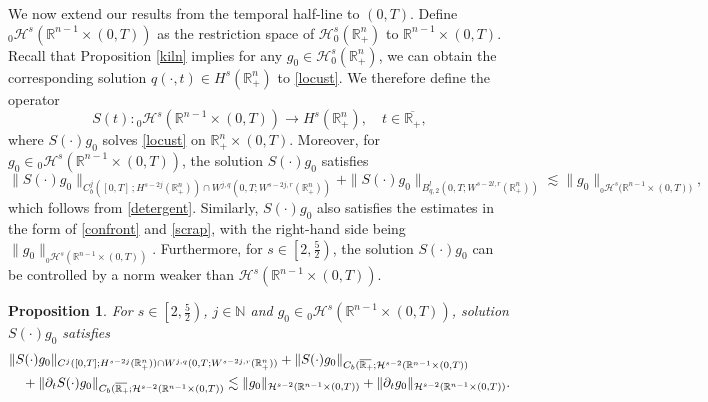 \documentclass[preprint,compress,12pt]{elsarticle}
\newtheorem{proposition}[theorem]{Proposition}
\numberwithin{equation}{section}
\begin{document}
We now extend our results from the temporal half-line to $(0,T)$. Define ${}_{0}\mathcal{H}^{s}(\mathbb{R}^{n-1}\times(0,T))$ as the restriction space
of $\mathcal{H}_{0}^{s}(\mathbb{R}^{n}_{+})$ to $\mathbb{R}^{n-1}\times(0,T)$. Recall that Proposition \ref{kiln} implies for any  $g_{0}\in\mathcal{H}_{0}^{s}(\mathbb{R}_{+}^{n})$, we can obtain the corresponding solution $q(\cdot,t)\in H^{s}(\mathbb{R}^{n}_{+})$ to \eqref{locust}. We therefore define the operator
\begin{equation}\label{st}
	S(t): {}_{0}\mathcal{H}^{s}(\mathbb{R}^{n-1}\times(0,T))\to H^{s}(\mathbb{R}^{n}_{+}),\quad  t\in\overline{\mathbb{R}_{+}},
\end{equation}
where $S(\cdot)g_{0}$  solves \eqref{locust} on $\mathbb{R}^{n}_{+}\times (0,T)$. Moreover, for $g_{0}\in{}_{0}\mathcal{H}^{s}(\mathbb{R}^{n-1}\times(0,T))$, the solution $S(\cdot)g_{0}$ satisfies
{\small
	\begin{equation}\label{grit}
		\|S(\cdot)g_{0}\|_{C_{b}^{j}([0,T]\,;H^{s-2j}(\mathbb{R}^{n}_{+}))\cap W^{j,q}(0,T;W ^{s-2j,r}(\mathbb{R}_{+}^{n}))}
		+\|S(\cdot)g_{0}\|_{ B^{l}_{q,2}(0,T;W^{s-2l,r}(\mathbb{R}^{n}_{+})) }
		\lesssim\|g_{0}\|_{_{0}\mathcal{H}^{s}({\mathbb{R}^{n-1}\times(0,T))}},
\end{equation}}
which follows from \eqref{detergent}. Similarly, $S(\cdot)g_{0}$ also satisfies the estimates in the form of \eqref{confront} and \eqref{scrap}, with the right-hand side being $\|g_{0}\|_{{}_{0}\mathcal{H}^{s}(\mathbb{R}^{n-1}\times(0,T))}$. Furthermore, for  $s\in\left[2,\frac{5}{2}\right)$, the solution $S(\cdot)g_{0}$ can be controlled by a norm weaker than $\mathcal{H}^{s}(\mathbb{R}^{n-1}\times(0,T))$.
\begin{proposition}
	For $s\in \left[2,\frac{5}{2}\right)$, $j\in\mathbb{N}$ and  $g_{0}\in  {}_{0}\mathcal{H}^{s}(\mathbb{R}^{n-1}\times(0,T))$, solution $S(\cdot)g_{0}$ satisfies
	\begin{equation}\label{squeak}
		\begin{aligned} &\|S(\cdot)g_{0}\|_{C^{j}([0,T];H^{s-2j}(\mathbb{R}^{n}_{+}))\cap W^{j,q}(0,T;W^{s-2j,r}(\mathbb{R}^{n}_{+}))}+\|S(\cdot)g_{0}\|_{C_{b}(\overline{\mathbb{R}_{+}\mkern-4mu}\,;\mathcal{H}^{s-2}(\mathbb{R}^{n-1}\times(0,T))}\\
			&\quad+\|\partial_{t}S(\cdot)g_{0}\|_{C_{b}(\overline{\mathbb{R}_{+}\mkern-4mu}\,;\mathcal{H}^{s-2}(\mathbb{R}^{n-1}\times(0,T))}
			\lesssim \|g_{0}\|_{\mathcal{H}^{s-2}(\mathbb{R}^{n-1}\times(0,T))} +\|\partial_{t}g_{0}\|_{\mathcal{H}^{s-2}(\mathbb{R}^{n-1}\times(0,T))}.
		\end{aligned}
	\end{equation}
\end{proposition}
\end{document}
